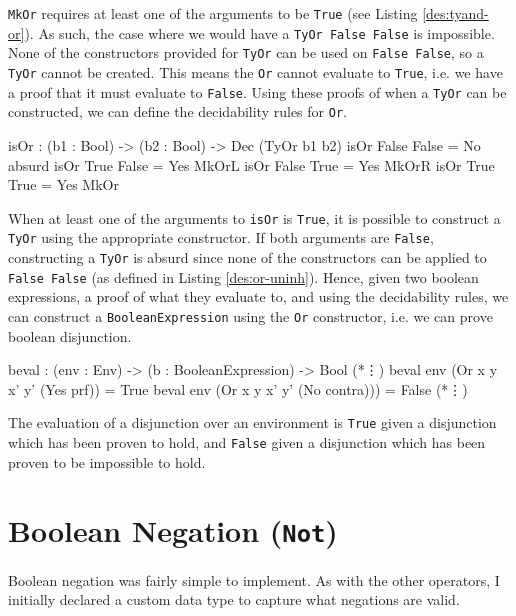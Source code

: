     \texttt{MkOr} requires at least one of the arguments to be \texttt{True} (see Listing \ref{des:tyand-or}). As such, the case where we would have a \texttt{TyOr False False} is impossible. None of the constructors provided for \texttt{TyOr} can be used on \texttt{False False}, so a \texttt{TyOr} cannot be created. This means the \texttt{Or} cannot evaluate to \texttt{True}, i.e. we have a proof that it must evaluate to \texttt{False}. Using these proofs of when a \texttt{TyOr} can be constructed, we can define the decidability rules for \texttt{Or}.
    
    \begin{code}[caption={Decidability rules for \texttt{Or}}]
        isOr : (b1 : Bool) -> (b2 : Bool) -> Dec (TyOr b1 b2)
        isOr False False = No absurd
        isOr True False  = Yes MkOrL
        isOr False True  = Yes MkOrR
        isOr True True   = Yes MkOr
    \end{code}
    
    When at least one of the arguments to \texttt{isOr} is \texttt{True}, it is possible to construct a \texttt{TyOr} using the appropriate constructor. If both arguments are \texttt{False}, constructing a \texttt{TyOr} is absurd since none of the constructors can be applied to \texttt{False False} (as defined in Listing \ref{des:or-uninh}). Hence, given two boolean expressions, a proof of what they evaluate to, and using the decidability rules, we can construct a \texttt{BooleanExpression} using the \texttt{Or} constructor, i.e. we can prove boolean disjunction.
    
    \begin{code}[caption={Evaluating \texttt{Or} over an environment}, escapeinside={(*}{*)}]
        beval : (env : Env) -> (b : BooleanExpression) -> Bool
        (*\vdots*)
        beval env (Or x y x' y' (Yes prf))    = True
        beval env (Or x y x' y' (No contra))) = False
        (*\vdots*)
    \end{code}

    The evaluation of a disjunction over an environment is \texttt{True} given a disjunction which has been proven to hold, and \texttt{False} given a disjunction which has been proven to be impossible to hold.


\section{Boolean Negation (\texttt{Not})}
    Boolean negation was fairly simple to implement. As with the other operators, I initially declared a custom data type to capture what negations are valid.
    

